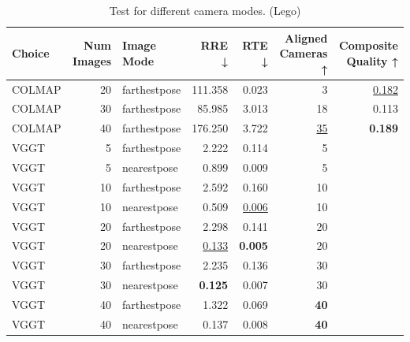 \begin{table}[H]
\caption{Test for different camera modes. (Lego)}
\label{tab:99_nearest_pose_lego}
\begin{tabular}{lrlrrrr}
\toprule
Choice & Num Images & Image Mode & RRE ↓ & RTE ↓ & Aligned Cameras ↑ & Composite Quality ↑ \\
\midrule
COLMAP & 20 & farthestpose & 111.358 & 0.023 & 3 & \underline{0.182} \\
COLMAP & 30 & farthestpose & 85.985 & 3.013 & 18 & 0.113 \\
COLMAP & 40 & farthestpose & 176.250 & 3.722 & \underline{35} & \textbf{0.189} \\
VGGT & 5 & farthestpose & 2.222 & 0.114 & 5 &  \\
VGGT & 5 & nearestpose & 0.899 & 0.009 & 5 &  \\
VGGT & 10 & farthestpose & 2.592 & 0.160 & 10 &  \\
VGGT & 10 & nearestpose & 0.509 & \underline{0.006} & 10 &  \\
VGGT & 20 & farthestpose & 2.298 & 0.141 & 20 &  \\
VGGT & 20 & nearestpose & \underline{0.133} & \textbf{0.005} & 20 &  \\
VGGT & 30 & farthestpose & 2.235 & 0.136 & 30 &  \\
VGGT & 30 & nearestpose & \textbf{0.125} & 0.007 & 30 &  \\
VGGT & 40 & farthestpose & 1.322 & 0.069 & \textbf{40} &  \\
VGGT & 40 & nearestpose & 0.137 & 0.008 & \textbf{40} &  \\
\bottomrule
\end{tabular}
\end{table}
